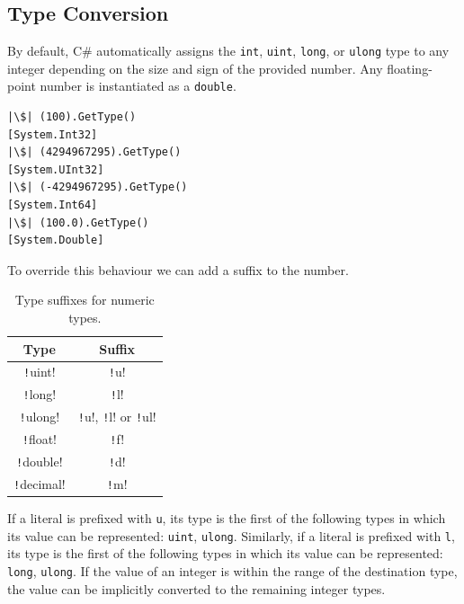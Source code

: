 \documentclass{article}
\begin{document}
\subsection{Type Conversion}
By default, C\# automatically assigns the \texttt{int},
\texttt{uint}, \texttt{long}, or
\texttt{ulong} type to any integer \linebreak depending on
the size and sign of the provided number. Any floating-point number is
instantiated as a \texttt{double}.
\begin{verbatim}
|\$| (100).GetType()
[System.Int32]
|\$| (4294967295).GetType()
[System.UInt32]
|\$| (-4294967295).GetType()
[System.Int64]
|\$| (100.0).GetType()
[System.Double]
\end{verbatim}
To override this behaviour we can add a suffix to the number.
\begin{table}[H]
    \centering
    \begin{tabular}{c c}
        \toprule
        \textbf{Type}                & \textbf{Suffix}                                                           \\
        \midrule
        \texttt!uint!    & \texttt!u!                                                    \\
        \texttt!long!    & \texttt!l!                                                    \\
        \texttt!ulong!   & \texttt!u!, \texttt!l! or \texttt!ul! \\
        \midrule
        \texttt!float!   & \texttt!f!                                                    \\
        \texttt!double!  & \texttt!d!                                                    \\
        \texttt!decimal! & \texttt!m!                                                    \\
        \bottomrule
    \end{tabular}
    \caption{Type suffixes for numeric types.}
\end{table}
If a literal is prefixed with \texttt{u}, its type is the first
of the following types in which its value can be represented:
\texttt{uint}, \texttt{ulong}.
Similarly, if a literal is prefixed with \texttt{l}, its type is the first
of the following types in which its value can be represented:
\texttt{long}, \texttt{ulong}.
If the value of an integer is within the range of the destination type,
the value can be implicitly converted to the remaining integer types.
\end{document}
